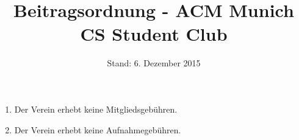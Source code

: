 \documentclass{article}
\title{Beitragsordnung - ACM Munich CS Student Club}
\date{Stand: 6. Dezember 2015}
\begin{document}
\large
\maketitle

\thispagestyle{empty}
\begin{enumerate}
 	\item Der Verein erhebt keine Mitgliedsgebühren.
 	\item Der Verein erhebt keine Aufnahmegebühren.
\end{enumerate}
\end{document}
